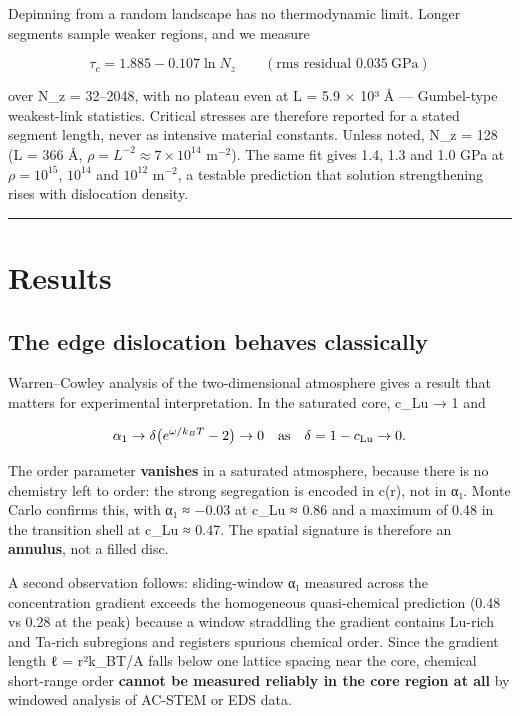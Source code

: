 \documentclass[11pt,a4paper]{article}
\begin{document}
Depinning from a random landscape has no thermodynamic limit. Longer segments sample weaker regions, and we measure

\[\tau_c = 1.885 - 0.107\ln N_z\qquad(\text{rms residual }0.035\ \text{GPa})\]

over N\_z = 32--2048, with no plateau even at L = 5.9 × 10³ Å --- Gumbel-type weakest-link statistics. Critical stresses are therefore reported for a stated segment length, never as intensive material constants. Unless noted, N\_z = 128 (L = 366 Å, \(\rho = L^{-2}\approx7\times10^{14}\) m\(^{-2}\)). The same fit gives 1.4, 1.3 and 1.0 GPa at \(\rho = 10^{15}\), \(10^{14}\) and \(10^{12}\) m\(^{-2}\), a testable prediction that solution strengthening rises with dislocation density.

\begin{center}\rule{0.5\linewidth}{0.5pt}\end{center}

\hypertarget{results}{%
\section{Results}\label{sec:results}}

\hypertarget{the-edge-dislocation-behaves-classically}{%
\subsection{The edge dislocation behaves classically}\label{sec:the-edge-dislocation-behaves-classically}}

Warren--Cowley analysis \cite{warren1969} of the two-dimensional atmosphere gives a result that matters for experimental interpretation. In the saturated core, c\_Lu → 1 and

\[\alpha_1 \to \delta\bigl(e^{\omega/k_BT} - 2\bigr) \to 0 \quad\text{as}\quad \delta = 1 - c_{\rm Lu} \to 0.\]

The order parameter \textbf{vanishes} in a saturated atmosphere, because there is no chemistry left to order: the strong segregation is encoded in c(r), not in α₁. Monte Carlo confirms this, with α₁ ≈ −0.03 at c\_Lu ≈ 0.86 and a maximum of 0.48 in the transition shell at c\_Lu ≈ 0.47. The spatial signature is therefore an \textbf{annulus}, not a filled disc.

A second observation follows: sliding-window α₁ measured across the concentration gradient exceeds the homogeneous quasi-chemical prediction (0.48 vs 0.28 at the peak) because a window straddling the gradient contains Lu-rich and Ta-rich subregions and registers spurious chemical order. Since the gradient length ℓ = r²k\_BT/A falls below one lattice spacing near the core, chemical short-range order \textbf{cannot be measured reliably in the core region at all} by windowed analysis of AC-STEM or EDS data.
\end{document}
